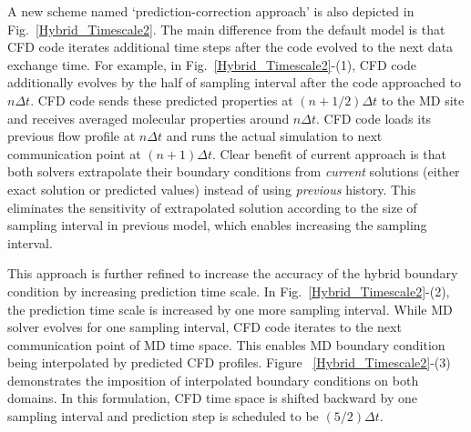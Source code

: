 \documentclass[preprint,12pt]{elsarticle}
\begin{document}
A new scheme named `prediction-correction approach' is also depicted in Fig.~\ref{Hybrid_Timescale2}. The main difference from the default model is that CFD code iterates additional  time steps after the code evolved to the next data exchange time. For example, in Fig.~\ref{Hybrid_Timescale2}-(1), CFD code additionally evolves by the half of sampling interval after the code approached to $n{\Delta}t$. CFD code sends these predicted properties at $(n+1/2){\Delta}t$ to the MD site and receives averaged molecular properties around $n{\Delta}t$. CFD code loads its previous flow profile at $n{\Delta}t$ and runs the actual simulation to next communication point at $(n+1){\Delta}t$. Clear benefit of current approach is that both solvers extrapolate their boundary conditions from \textit{current} solutions (either exact solution or predicted values) instead of using \textit{previous} history. This eliminates the sensitivity of extrapolated solution according to the size of sampling interval in previous model, which enables increasing the sampling interval.

This approach is further refined to increase the accuracy of the hybrid boundary condition by increasing prediction time scale. In Fig.~\ref{Hybrid_Timescale2}-(2), the prediction time scale is increased by one more sampling interval. While MD solver evolves for one sampling interval, CFD code iterates to the next communication point of MD time space. This enables MD boundary condition being interpolated by predicted CFD profiles. Figure ~\ref{Hybrid_Timescale2}-(3) demonstrates the imposition of interpolated boundary conditions on both domains. In this formulation, CFD time space is shifted backward by one sampling interval and prediction step is scheduled to be $(5/2){\Delta}t$.
\end{document}
